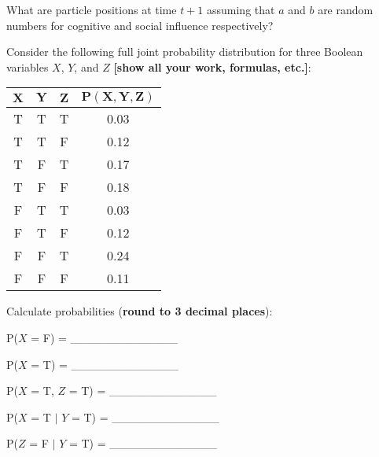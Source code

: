 \documentclass[assignment={3},
	duedate={Sunday, March 31, 2024, 11:59 PM CST},
	points={80},
	type={Written},
	template=true
]{cs581homework}
\begin{document}
What are particle positions at time $t+1$ assuming that $a$ and $b$ are random numbers for cognitive and social influence respectively?

\begin{answerbox}

\end{answerbox}

Consider the following full joint probability distribution for three Boolean variables $X$, $Y$, and $Z$ \textbf{[show all your work, formulas, etc.]}:\\

\begin{minipage}[t]{0.35\textwidth}
	\begin{table}[H]
		\centering
		\label{tab:prb-2}
		\begin{tabular}{|*{4}{c|}}
			\hline
			$\mathbf{X}$ & $\mathbf{Y}$ & $\mathbf{Z}$ & $\mathbf{P(X,Y,Z)}$\\
			\hline
			T & T & T & 0.03\\
			\hline
			T & T & F & 0.12\\
			\hline
			T & F & T & 0.17\\
			\hline
			T & F & F & 0.18\\
			\hline
			F & T & T & 0.03\\
			\hline
			F & T & F & 0.12\\
			\hline
			F & F & T & 0.24\\
			\hline
			F & F & F & 0.11\\
			\hline
		\end{tabular}
	\end{table}
\end{minipage}\hfill%
\begin{minipage}[t]{0.6\textwidth}
	Calculate probabilities (\textbf{round to 3 decimal places}):
	\begin{enumerate}[label=\alph*) \textbf{[1 pt]}]
		\item P($X$ = F) = \_\_\_\_\_\_\_\_\_\_\_\_\_
		\item P($X$ = T) = \_\_\_\_\_\_\_\_\_\_\_\_\_
		\item P($X$ = T, $Z$ = T) = \_\_\_\_\_\_\_\_\_\_\_\_\_
		\item P($X$ = T $|$ $Y$ = T) = \_\_\_\_\_\_\_\_\_\_\_\_\_
		\item P($Z$ = F $|$ $Y$ = T) = \_\_\_\_\_\_\_\_\_\_\_\_\_
	\end{enumerate}
\end{minipage}
\end{document}
